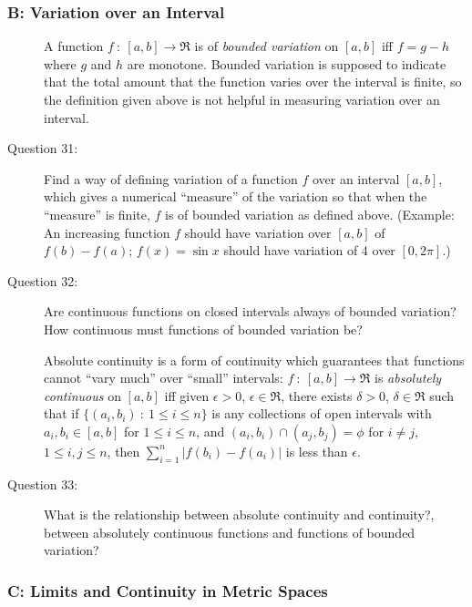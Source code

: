 \documentclass{article}
\begin{document}
\subsubsection*{B: Variation over an Interval}

\begin{description}

  \item[] A function $f\ :\ [a,b] \to \Re$ is of \emph{bounded variation} on $[a,b]$ iff $f = g - h$ where $g$ and $h$ are monotone. Bounded variation is supposed to indicate that the total amount that the function varies over the interval is finite, so the definition given above is not helpful in measuring variation over an interval.

  \item[Question 31:] Find a way of defining variation of a function $f$ over an interval $[a,b]$, which gives a numerical ``measure'' of the variation so that when the ``measure'' is finite, $f$ is of bounded variation as defined above. (Example: An increasing function $f$ should have variation over $[a,b]$ of $f(b) - f(a)$; $f(x) = \sin x$ should have variation of $4$ over $[0, 2\pi]$.)

  \item[Question 32:] Are continuous functions on closed intervals always of bounded variation? How continuous must functions of bounded variation be?

  \item[] Absolute continuity is a form of continuity which guarantees that functions cannot ``vary much'' over ``small'' intervals: $f\ :\ [a,b] \to \Re$ is \emph{absolutely continuous} on $[a,b]$ iff given $\epsilon > 0$, $\epsilon \in \Re$, there exists $\delta > 0$, $\delta \in \Re$ such that if $\{ (a_i,b_i)\ :\ 1 \leq i \leq n \}$ is any collections of open intervals with $a_i,b_i \in [a,b]$ for $1 \leq i \leq n$, and $(a_i,b_i) \cap (a_j,b_j) = \phi$ for $i \neq j$, $1 \leq i,j \leq n$, then $\displaystyle \sum_{i=1}^n |f(b_i) - f(a_i)|$ is less than $\epsilon$.

  \item[Question 33:] What is the relationship between absolute continuity and continuity?, between absolutely continuous functions and functions of bounded variation?

\end{description}


\subsubsection*{C: Limits and Continuity in Metric Spaces}
\end{document}
